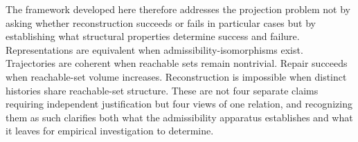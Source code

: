 The framework developed here therefore addresses the projection problem not by asking whether reconstruction succeeds or fails in particular cases but by establishing what structural properties determine success and failure. Representations are equivalent when admissibility-isomorphisms exist. Trajectories are coherent when reachable sets remain nontrivial. Repair succeeds when reachable-set volume increases. Reconstruction is impossible when distinct histories share reachable-set structure. These are not four separate claims requiring independent justification but four views of one relation, and recognizing them as such clarifies both what the admissibility apparatus establishes and what it leaves for empirical investigation to determine.
